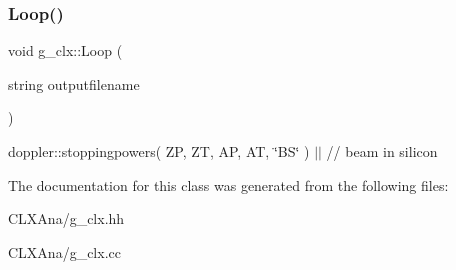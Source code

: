 \subsubsection{\texorpdfstring{Loop()}{Loop()}}
{\footnotesize\ttfamily void g\+\_\+clx\+::\+Loop (\begin{DoxyParamCaption}\item[{string}]{outputfilename }\end{DoxyParamCaption})\hspace{0.3cm}{\ttfamily [virtual]}}

doppler\+::stoppingpowers( ZP, ZT, AP, AT, \char`\"{}\+B\+S\char`\"{} ) $\vert$$\vert$ // beam in silicon 

The documentation for this class was generated from the following files\+:\begin{DoxyCompactItemize}
\item 
C\+L\+X\+Ana/g\+\_\+clx.\+hh\item 
C\+L\+X\+Ana/g\+\_\+clx.\+cc\end{DoxyCompactItemize}
